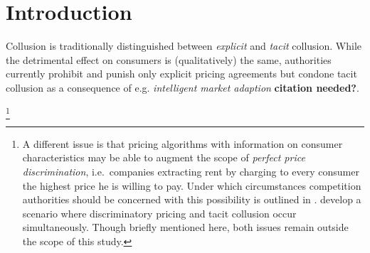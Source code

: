 \section{Introduction}

Collusion is traditionally distinguished between \emph{explicit} and \emph{tacit} collusion. While the detrimental effect on consumers is (qualitatively) the same, authorities currently prohibit and punish only explicit pricing agreements but condone tacit collusion as a consequence of e.g. \emph{intelligent market adaption} \textbf{citation needed?}.


\footnote{A different issue is that pricing algorithms with information on consumer characteristics may be able to augment the scope of \emph{perfect price discrimination}, i.e.\ companies extracting rent by charging to every consumer the highest price he is willing to pay. Under which circumstances competition authorities should be concerned with this possibility is outlined in \textcite{oecd_price_2016}. \textcite{ezrachi_algorithmic_2017} develop a scenario where discriminatory pricing and tacit collusion occur simultaneously. Though briefly mentioned here, both issues remain outside the scope of this study.}